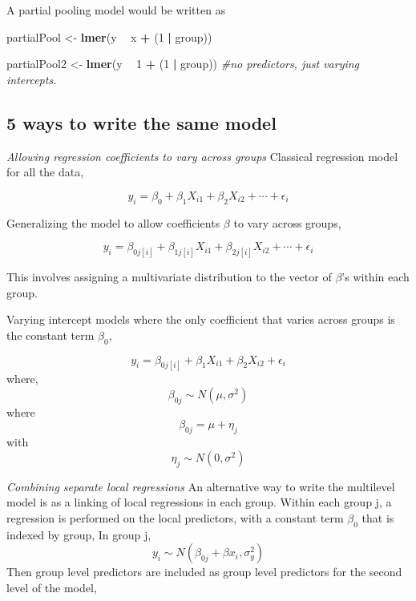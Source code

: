 \documentclass[12pt,]{article}
\newenvironment{Shaded}{\begin{snugshade}}{\end{snugshade}}
\newcommand{\KeywordTok}[1]{\textcolor[rgb]{0.13,0.29,0.53}{\textbf{#1}}}
\newcommand{\DecValTok}[1]{\textcolor[rgb]{0.00,0.00,0.81}{#1}}
\newcommand{\StringTok}[1]{\textcolor[rgb]{0.31,0.60,0.02}{#1}}
\newcommand{\CommentTok}[1]{\textcolor[rgb]{0.56,0.35,0.01}{\textit{#1}}}
\newcommand{\OperatorTok}[1]{\textcolor[rgb]{0.81,0.36,0.00}{\textbf{#1}}}
\newcommand{\NormalTok}[1]{#1}
\begin{document}
A partial pooling model would be written as

\begin{Shaded}
\begin{Highlighting}[]
\NormalTok{partialPool <-}\StringTok{ }\KeywordTok{lmer}\NormalTok{(y }\OperatorTok{~}\StringTok{ }\NormalTok{x }\OperatorTok{+}\StringTok{ }\NormalTok{(}\DecValTok{1} \OperatorTok{|}\StringTok{ }\NormalTok{group))}

\NormalTok{partialPool2 <-}\StringTok{ }\KeywordTok{lmer}\NormalTok{(y }\OperatorTok{~}\StringTok{ }\DecValTok{1} \OperatorTok{+}\StringTok{ }\NormalTok{(}\DecValTok{1} \OperatorTok{|}\StringTok{ }\NormalTok{group)) }\CommentTok{#no predictors, just varying intercepts. }
\end{Highlighting}
\end{Shaded}

\subsection{5 ways to write the same
model}\label{ways-to-write-the-same-model}

\textit{Allowing regression coefficients to vary across groups}
Classical regression model for all the data,

\[
y_i = \beta_0 + \beta_1X_{i1} + \beta_2X_{i2} + \cdots + \epsilon_i
\]

Generalizing the model to allow coefficients \(\beta\) to vary across
groups,

\[
y_i = \beta_{0 j[i]} + \beta_{1 j[i]} X_{i1} + \beta_{2j[i]}X_{i2} + \cdots + \epsilon_i
\]

This involves assigning a multivariate distribution to the vector of
\(\beta\)'s within each group.

Varying intercept models where the only coefficient that varies across
groups is the constant term \(\beta_0\),

\[
y_i = \beta_{0j[i]} + \beta_1X_{i1} + \beta_2X_{i2} + \epsilon_i
\] where, \[\beta_{0j} \sim N(\mu, \sigma^2)\] where
\[\beta_{0j} = \mu + \eta_j\] with \[\eta_j \sim N(0, \sigma^2)\]

\textit{Combining separate local regressions} An alternative way to
write the multilevel model is as a linking of local regressions in each
group. Within each group j, a regression is performed on the local
predictors, with a constant term \(\beta_0\) that is indexed by group,
In group j, \[
y_i \sim N(\beta_{0j} + \beta x_i, \sigma^2_y)
\] Then group level predictors are included as group level predictors
for the second level of the model,
\end{document}
